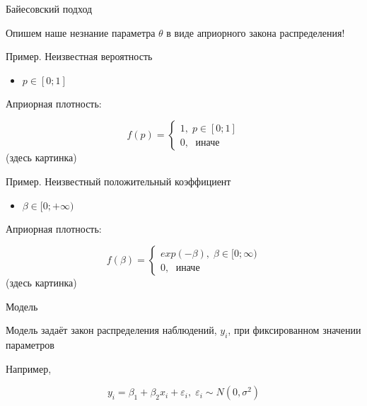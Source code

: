 \documentclass[ignorenonframetext,]{beamer}
\newcommand{\e}{\varepsilon}
\begin{document}
\begin{frame}{Байесовский подход}

Опишем наше незнание параметра \(\theta\) в виде априорного закона
распределения!

\end{frame}

\begin{frame}{Пример. Неизвестная вероятность}

\begin{itemize}
\itemsep1pt\parskip0pt
\item
  \(p \in [0;1]\)
\end{itemize}

Априорная плотность:

\[
f(p)=\begin{cases}
1, \; p\in[0;1] \\
0, \; \text{ иначе }
\end{cases}
\] (здесь картинка)

\end{frame}

\begin{frame}{Пример. Неизвестный положительный коэффициент}

\begin{itemize}
\itemsep1pt\parskip0pt
\item
  \(\beta \in [0;+\infty)\)
\end{itemize}

Априорная плотность:

\[
f(\beta)=\begin{cases}
exp(-\beta), \; \beta \in[0;\infty) \\
0, \; \text{ иначе }
\end{cases}
\] (здесь картинка)

\end{frame}

\begin{frame}{Модель}

Модель задаёт закон распределения наблюдений, \(y_i\), при фиксированном
значении параметров

Например,

\[
y_i = \beta_1 + \beta_2 x_i + \e_i, \; \e_i \sim N(0,\sigma^2)
\]

\end{frame}
\end{document}
